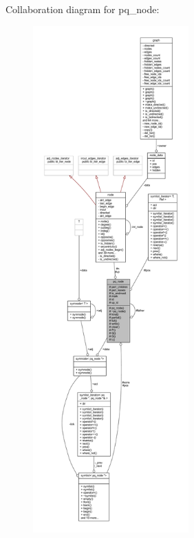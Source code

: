Collaboration diagram for pq\+\_\+node\+:\nopagebreak
\begin{figure}[H]
\begin{center}
\leavevmode
\includegraphics[height=550pt]{classpq__node__coll__graph}
\end{center}
\end{figure}
